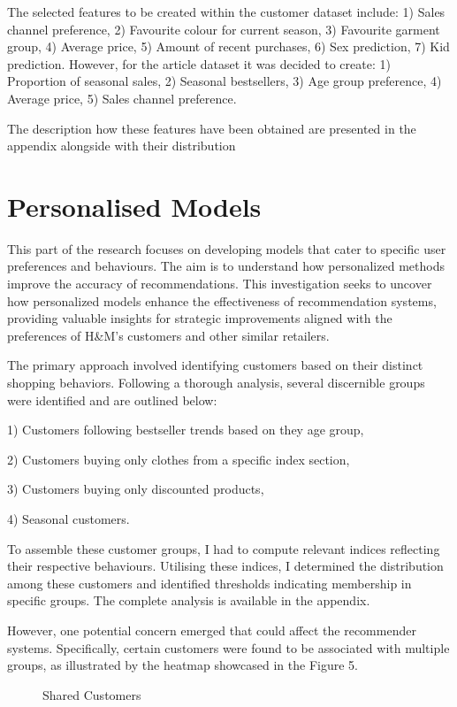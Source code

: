 \documentclass[conference,compsoc]{IEEEtran}
\begin{document}
The selected features to be created within the customer dataset include:
1) Sales channel preference,
2) Favourite colour for current season,
3) Favourite garment group,
4) Average price,
5) Amount of recent purchases,
6) Sex prediction,
7) Kid prediction.
However, for the article dataset it was decided to create:
1) Proportion of seasonal sales,
2) Seasonal bestsellers,
3) Age group preference,
4) Average price,
5) Sales channel preference.

The description how these features have been obtained are presented in the appendix alongside with their distribution

\section{Personalised Models}
This part of the research focuses on developing models that cater to specific user preferences and behaviours. The aim is to understand how personalized methods improve the accuracy of recommendations. This investigation seeks to uncover how personalized models enhance the effectiveness of recommendation systems, providing valuable insights for strategic improvements aligned with the preferences of H\&M's customers and other similar retailers.

The primary approach involved identifying customers based on their distinct shopping behaviors. Following a thorough analysis, several discernible groups were identified and are outlined below:

1) Customers following bestseller trends based on they age group,

2) Customers buying only clothes from a specific index section,

3) Customers buying only discounted products,

4) Seasonal customers.

To assemble these customer groups, I had to compute relevant indices reflecting their respective behaviours. Utilising these indices, I determined the distribution among these customers and identified thresholds indicating membership in specific groups. The complete analysis is available in the appendix.

However, one potential concern emerged that could affect the recommender systems. Specifically, certain customers were found to be associated with multiple groups, as illustrated by the heatmap showcased in the Figure 5.
\begin{figure}[htbp]
    \centering
    \caption{Shared Customers}
    \label{fig:example}
\end{figure}
\end{document}
